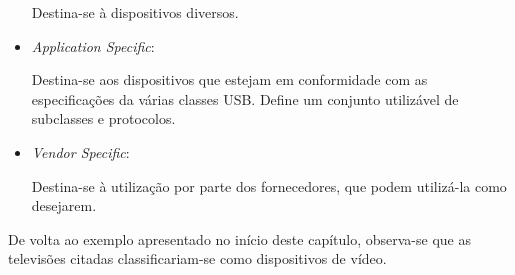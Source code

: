 \begin{itemize}
	Destina-se à dispositivos diversos.
	\item \emph{Application Specific}:

	Destina-se aos dispositivos que estejam em conformidade com as especificações da várias classes USB. Define um conjunto utilizável de subclasses e protocolos.
	\item \emph{Vendor Specific}:

	Destina-se à utilização por parte dos fornecedores, que podem utilizá-la como desejarem.
\end{itemize}

De volta ao exemplo apresentado no início deste capítulo, observa-se que as televisões citadas classificariam-se como dispositivos de vídeo.
